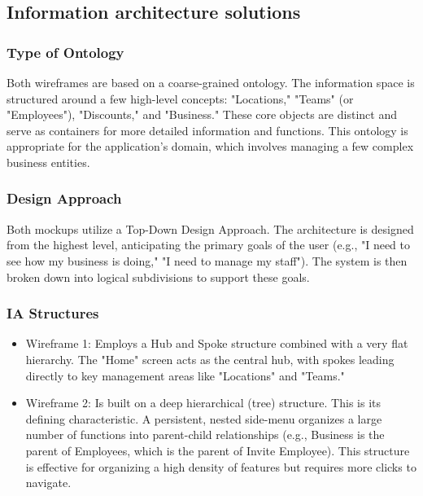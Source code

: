 \documentclass[]{VUMIFTemplateClass}
\begin{document}
\subsection{Information architecture solutions}



\subsubsection{Type of Ontology}

Both wireframes are based on a coarse-grained ontology. The information space is structured around a few high-level concepts: "Locations," "Teams" (or "Employees"), "Discounts," and "Business." These core objects are distinct and serve as containers for more detailed information and functions. This ontology is appropriate for the application's domain, which involves managing a few complex business entities.

\subsubsection{Design Approach}

Both mockups utilize a Top-Down Design Approach. The architecture is designed from the highest level, anticipating the primary goals of the user (e.g., "I need to see how my business is doing," "I need to manage my staff"). The system is then broken down into logical subdivisions to support these goals.

\subsubsection{IA Structures}

\begin{itemize}
    \item Wireframe 1: Employs a Hub and Spoke structure combined with a very flat hierarchy. The "Home" screen acts as the central hub, with spokes leading directly to key management areas like "Locations" and "Teams."
    \item Wireframe 2: Is built on a deep hierarchical (tree) structure. This is its defining characteristic. A persistent, nested side-menu organizes a large number of functions into parent-child relationships (e.g., Business is the parent of Employees, which is the parent of Invite Employee). This structure is effective for organizing a high density of features but requires more clicks to navigate.
\end{itemize}
\end{document}
